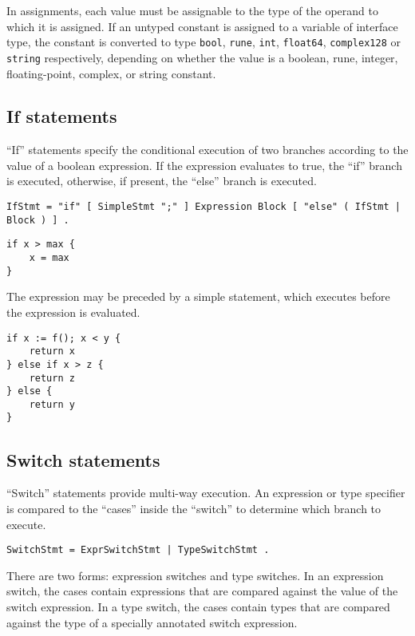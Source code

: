 {In assignments, each value must be assignable
to the type of the operand to which it is assigned. If an untyped
constant is assigned to a variable of interface
type, the constant is converted to type
\texttt{bool}, \texttt{rune}, \texttt{int}, \texttt{float64},
\texttt{complex128} or \texttt{string} respectively, depending on
whether the value is a boolean, rune, integer, floating-point, complex,
or string constant.

\subsection*{If statements}

``If'' statements specify the conditional execution of two branches
according to the value of a boolean expression. If the expression
evaluates to true, the ``if'' branch is executed, otherwise, if present,
the ``else'' branch is executed.

\begin{Verbatim}[frame=single]
IfStmt = "if" [ SimpleStmt ";" ] Expression Block [ "else" ( IfStmt | Block ) ] .
\end{Verbatim}

\begin{Verbatim}[frame=single]
if x > max {
    x = max
}
\end{Verbatim}

The expression may be preceded by a simple statement, which executes
before the expression is evaluated.

\begin{Verbatim}[frame=single]
if x := f(); x < y {
    return x
} else if x > z {
    return z
} else {
    return y
}
\end{Verbatim}

\subsection*{Switch statements}

``Switch'' statements provide multi-way execution. An expression or type
specifier is compared to the ``cases'' inside the ``switch'' to
determine which branch to execute.

\begin{Verbatim}[frame=single]
SwitchStmt = ExprSwitchStmt | TypeSwitchStmt .
\end{Verbatim}

There are two forms: expression switches and type switches. In an
expression switch, the cases contain expressions that are compared
against the value of the switch expression. In a type switch, the cases
contain types that are compared against the type of a specially
annotated switch expression.

}
